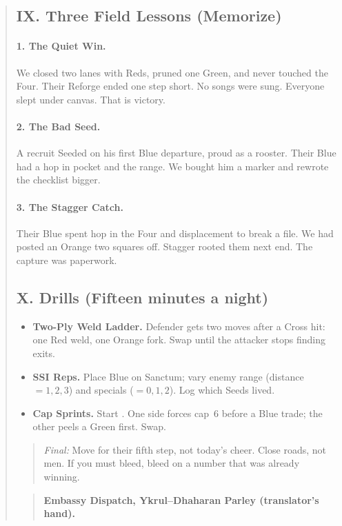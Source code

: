 \documentclass[11pt]{article}
\newcommand{\CapC}[1]{\textcolor{green!40!black}{\scriptsize\ttfamily[G:#1]}}
\begin{document}
\begin{quote}
\subsection{IX. Three Field Lessons (Memorize)}
\paragraph{1. The Quiet Win.} We closed two lanes with Reds, pruned one Green, and never touched the Four. Their Reforge ended one step short. No songs were sung. Everyone slept under canvas. That is victory.
\paragraph{2. The Bad Seed.} A recruit Seeded on his first Blue departure, proud as a rooster. Their Blue had a hop in pocket and the range. We bought him a marker and rewrote the checklist bigger.
\paragraph{3. The Stagger Catch.} Their Blue spent hop in the Four and displacement to break a file. We had posted an Orange two squares off. Stagger rooted them next end. The capture was paperwork.

\subsection{X. Drills (Fifteen minutes a night)}
\begin{itemize}\itemsep0.2em
  \item \textbf{Two-Ply Weld Ladder.} Defender gets two moves after a Cross hit: one Red weld, one Orange fork. Swap until the attacker stops finding exits.
  \item \textbf{SSI Reps.} Place Blue on Sanctum; vary enemy range (distance $=1,2,3$) and specials ($=0,1,2$). Log which Seeds lived.
  \item \textbf{Cap Sprints.} Start \CapC{3--2}. One side forces cap~6 before a Blue trade; the other peels a Green first. Swap.
\end{itemize}

\begin{quote}\small
\emph{Final:} Move for their fifth step, not today's cheer. Close roads, not men. If you must bleed, bleed on a number that was already winning.
\end{quote}
\clearpage

\begin{quote}
\textbf{Embassy Dispatch, Ykrul--Dhaharan Parley (translator's hand).}


\end{quote}
\end{quote}
\end{document}
